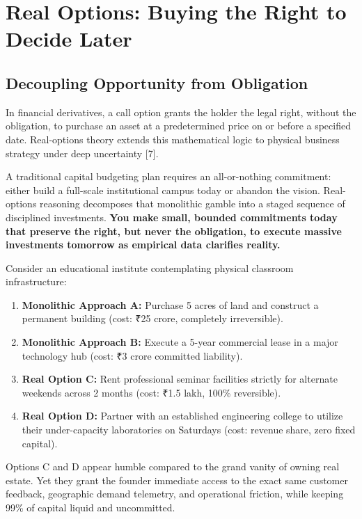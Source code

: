 \section{Real Options: Buying the Right to Decide Later}

\subsection{Decoupling Opportunity from Obligation}

In financial derivatives, a call option grants the holder the legal right, without the obligation, to purchase an asset at a predetermined price on or before a specified date. Real-options theory extends this mathematical logic to physical business strategy under deep uncertainty [7].

A traditional capital budgeting plan requires an all-or-nothing commitment: either build a full-scale institutional campus today or abandon the vision. Real-options reasoning decomposes that monolithic gamble into a staged sequence of disciplined investments. \textbf{You make small, bounded commitments today that preserve the right, but never the obligation, to execute massive investments tomorrow as empirical data clarifies reality.}

Consider an educational institute contemplating physical classroom infrastructure:

\begin{enumerate}[leftmargin=12pt,itemsep=2pt,topsep=1pt,parsep=0pt]
  \item \textbf{Monolithic Approach A:} Purchase 5 acres of land and construct a permanent building (cost: ₹25 crore, completely irreversible).
  \item \textbf{Monolithic Approach B:} Execute a 5-year commercial lease in a major technology hub (cost: ₹3 crore committed liability).
  \item \textbf{Real Option C:} Rent professional seminar facilities strictly for alternate weekends across 2 months (cost: ₹1.5 lakh, 100\% reversible).
  \item \textbf{Real Option D:} Partner with an established engineering college to utilize their under-capacity laboratories on Saturdays (cost: revenue share, zero fixed capital).
\end{enumerate}

Options C and D appear humble compared to the grand vanity of owning real estate. Yet they grant the founder immediate access to the exact same customer feedback, geographic demand telemetry, and operational friction, while keeping 99\% of capital liquid and uncommitted.


